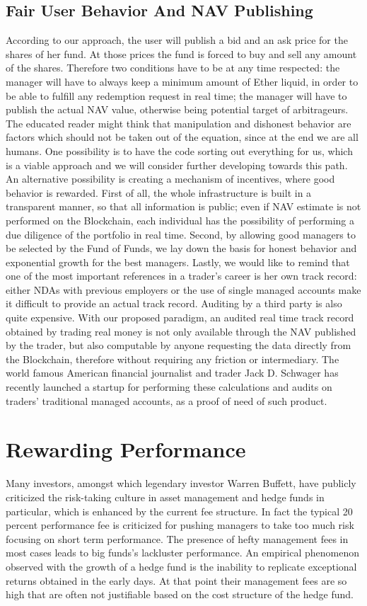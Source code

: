 \documentclass[9pt,oneside]{amsart}
\begin{document}
\begin{multicols}{2}
\subsection{Fair User Behavior And NAV Publishing}
According to our approach, the user will publish a bid and an ask price for the shares of her fund. At those prices the fund is forced to buy and sell any amount of the shares. Therefore two conditions have to be at any time respected: the manager will have to always keep a minimum amount of Ether liquid, in order to be able to fulfill any redemption request in real time; the manager will have to publish the actual NAV value, otherwise being potential target of arbitrageurs.
The educated reader might think that manipulation and dishonest behavior are factors which should not be taken out of the equation, since at the end we are all humans. One possibility is to have the code sorting out everything for us, which is a viable approach and we will consider further developing towards this path. An alternative possibility is creating a mechanism of incentives, where good behavior is rewarded. First of all, the whole infrastructure is built in a transparent manner, so that all information is public; even if NAV estimate is not performed on the Blockchain, each individual has the possibility of performing a due diligence of the portfolio in real time. Second, by allowing good managers to be selected by the Fund of Funds, we lay down the basis for honest behavior and exponential growth for the best managers.
Lastly, we would like to remind that one of the most important references in a trader's career is her own track record: either NDAs with previous employers or the use of single managed accounts make it difficult to provide an actual track record. Auditing by a third party is also quite expensive. With our proposed paradigm, an audited real time track record obtained by trading real money is not only available through the NAV published by the trader, but also computable by anyone requesting the data directly from the Blockchain, therefore without requiring any friction or intermediary. The world famous American financial journalist and trader Jack D. Schwager has recently launched a startup for performing these calculations and audits on traders' traditional managed accounts, as a proof of need of such product.

\section{Rewarding Performance}
Many investors, amongst which legendary investor Warren Buffett, have publicly criticized the risk-taking culture in asset management and hedge funds in particular, which is enhanced by the current fee structure. In fact the typical 20 percent performance fee is criticized for pushing managers to take too much risk focusing on short term performance. The presence of hefty management fees in most cases leads to big funds's lackluster performance. An empirical phenomenon observed with the growth of a hedge fund is the inability to replicate exceptional returns obtained in the early days. At that point their management fees are so high that are often not justifiable based on the cost structure of the hedge fund.


\end{multicols}
\end{document}
